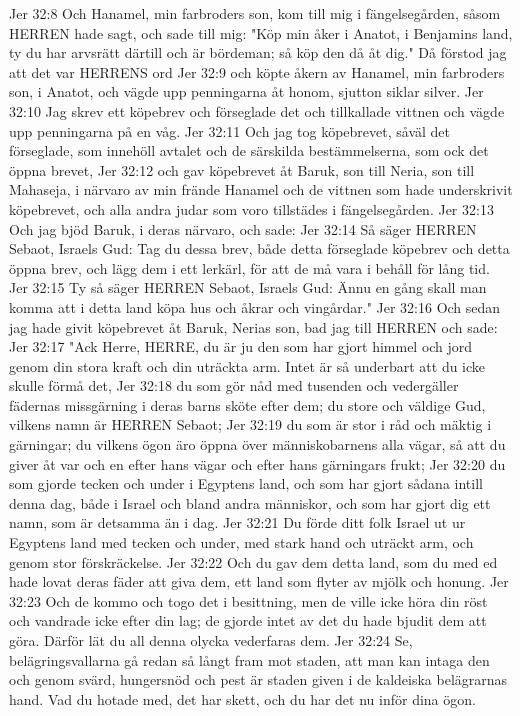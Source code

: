 Jer 32:8  Och Hanamel, min farbroders son, kom till mig i fängelsegården, såsom HERREN hade sagt, och sade till mig: "Köp min åker i Anatot, i Benjamins land, ty du har arvsrätt därtill och är bördeman; så köp den då åt dig." Då förstod jag att det var HERRENS ord
Jer 32:9  och köpte åkern av Hanamel, min farbroders son, i Anatot, och vägde upp penningarna åt honom, sjutton siklar silver.
Jer 32:10  Jag skrev ett köpebrev och förseglade det och tillkallade vittnen och vägde upp penningarna på en våg.
Jer 32:11  Och jag tog köpebrevet, såväl det förseglade, som innehöll avtalet och de särskilda bestämmelserna, som ock det öppna brevet,
Jer 32:12  och gav köpebrevet åt Baruk, son till Neria, son till Mahaseja, i närvaro av min frände Hanamel och de vittnen som hade underskrivit köpebrevet, och alla andra judar som voro tillstädes i fängelsegården.
Jer 32:13  Och jag bjöd Baruk, i deras närvaro, och sade:
Jer 32:14  Så säger HERREN Sebaot, Israels Gud: Tag du dessa brev, både detta förseglade köpebrev och detta öppna brev, och lägg dem i ett lerkärl, för att de må vara i behåll för lång tid.
Jer 32:15  Ty så säger HERREN Sebaot, Israels Gud: Ännu en gång skall man komma att i detta land köpa hus och åkrar och vingårdar."
Jer 32:16  Och sedan jag hade givit köpebrevet åt Baruk, Nerias son, bad jag till HERREN och sade:
Jer 32:17  "Ack Herre, HERRE, du är ju den som har gjort himmel och jord genom din stora kraft och din uträckta arm. Intet är så underbart att du icke skulle förmå det,
Jer 32:18  du som gör nåd med tusenden och vedergäller fädernas missgärning i deras barns sköte efter dem; du store och väldige Gud, vilkens namn är HERREN Sebaot;
Jer 32:19  du som är stor i råd och mäktig i gärningar; du vilkens ögon äro öppna över människobarnens alla vägar, så att du giver åt var och en efter hans vägar och efter hans gärningars frukt;
Jer 32:20  du som gjorde tecken och under i Egyptens land, och som har gjort sådana intill denna dag, både i Israel och bland andra människor, och som har gjort dig ett namn, som är detsamma än i dag.
Jer 32:21  Du förde ditt folk Israel ut ur Egyptens land med tecken och under, med stark hand och uträckt arm, och genom stor förskräckelse.
Jer 32:22  Och du gav dem detta land, som du med ed hade lovat deras fäder att giva dem, ett land som flyter av mjölk och honung.
Jer 32:23  Och de kommo och togo det i besittning, men de ville icke höra din röst och vandrade icke efter din lag; de gjorde intet av det du hade bjudit dem att göra. Därför lät du all denna olycka vederfaras dem.
Jer 32:24  Se, belägringsvallarna gå redan så långt fram mot staden, att man kan intaga den och genom svärd, hungersnöd och pest är staden given i de kaldeiska belägrarnas hand. Vad du hotade med, det har skett, och du har det nu inför dina ögon.
